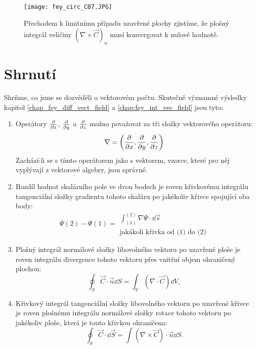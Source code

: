     \begin{figure}
      \centering
      \texttt{[image: fey\_circ\_C07.JPG]}
      \caption{Přechodem k limitnímu případu uzavřené plochy zjistíme, že plošný integrál veličiny
               \((\nabla\times\vec{C})_n\) musí konvergovat k nulové hodnotě.}
      \label{fyz:fig_fey_circ_C07}
    \end{figure}
  
  \section{Shrnutí}
    Shrňme, co jsme se dozvěděli o vektorovém počtu. Skutečně významné výsledky kapitol
    \ref{chap_fey_diff_vect_field} a \ref{chap:fey_int_vec_field} jsou tyto:
    \begin{enumerate}
      \item Operátory \(\frac{\partial  }{\partial x}\), \(\frac{\partial  }{\partial y}\) a  \(\frac{\partial  }{\partial z}\) možno považovat za tři
            složky vektorového operátoru:
            \begin{equation}
               \nabla = \left(\frac{\partial  }{\partial x}, \frac{\partial  }{\partial y}, \frac{\partial  }{\partial z}\right)
            \end{equation}
            Zachází-li se s tímto operátorem jako s vektorem, vzorce, které pro něj vyplývají z
            vektorové algebry, jsou správné.
      \item Rozdíl hodnot skalárního pole ve dvou bodech je roven křivkovému integrálu tangenciální
            složky gradientu tohoto skaláru po jakékoliv křivce spojující oba body:
            \begin{equation}
              \Psi(2)-\Psi(1) = 
                \begin{array}{l}
                  \displaystyle\int_{(1)}^{(2)}\nabla\Psi\cdot\dd{\vec{s}} \\
                  \text{jakákoli křivka od (1) do (2)}
                \end{array}
               \end{equation}
      \item Plošný integrál normálové složky libovolného vektoru po uzavřené ploše je roven 
            integrálu divergence tohoto vektoru přes vnitřní objem ohraničený plochou:
            \begin{equation}
              \oint_S \vec{C}\cdot\vec{n}\dd{S} = \int_V (\nabla\cdot\vec{C})\dd{V}, 
            \end{equation}
      \item Křivkový integrál tangenciální složky libovolného vektoru po uzavřené křivce je roven
            plošnému integrálu normálové složky rotace tohoto vektoru po jakékoliv ploše, která je
            touto křivkou ohraničena:
            \begin{equation}
              \oint_S\vec{C}\cdot\dd{\vec{S}} = \int(\nabla\times\vec{C})\cdot\vec{n}\dd{S}.
            \end{equation}            
    \end{enumerate}
      
